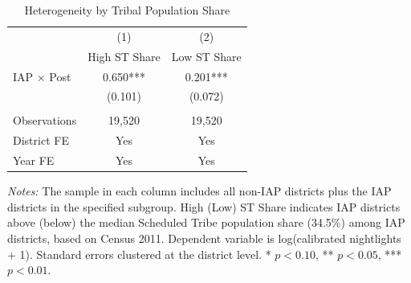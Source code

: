 \begin{table}[H]
\centering
\caption{Heterogeneity by Tribal Population Share}
\label{tab:hetero}
\begin{threeparttable}
\begin{tabular}{lcc}
\toprule
 & (1) & (2) \\
 & High ST Share & Low ST Share \\
\midrule
IAP $\times$ Post & 0.650*** & 0.201*** \\
 & (0.101) & (0.072) \\
 & & \\
Observations & 19,520 & 19,520 \\
District FE & Yes & Yes \\
Year FE & Yes & Yes \\
\bottomrule
\end{tabular}
\begin{tablenotes}[flushleft]
\small
\item \textit{Notes:} The sample in each column includes all non-IAP districts plus the IAP districts in the specified subgroup. High (Low) ST Share indicates IAP districts above (below) the median Scheduled Tribe population share (34.5\%) among IAP districts, based on Census 2011. Dependent variable is log(calibrated nightlights + 1). Standard errors clustered at the district level. * $p<0.10$, ** $p<0.05$, *** $p<0.01$.
\end{tablenotes}
\end{threeparttable}
\end{table}

